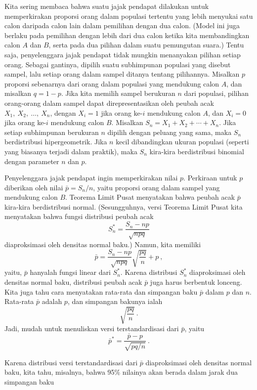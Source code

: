 \begin{example}\label{exam 9.4.1}
Kita sering membaca bahwa suatu jajak pendapat dilakukan untuk memperkirakan proporsi orang
dalam populasi tertentu yang lebih menyukai satu calon daripada calon lain dalam pemilihan dengan dua calon. 
(Model ini juga berlaku pada pemilihan dengan lebih dari dua calon ketika kita membandingkan calon $A$ dan $B$, serta pada dua pilihan
dalam suatu pemungutan suara.)  Tentu saja, penyelenggara jajak pendapat tidak mungkin menanyakan pilihan setiap orang. 
Sebagai gantinya, dipilih suatu subhimpunan populasi yang disebut sampel, lalu
setiap orang dalam sampel ditanya tentang pilihannya.  Misalkan $p$ proporsi sebenarnya dari orang dalam
populasi yang mendukung calon $A$, dan misalkan $q = 1-p$.  Jika kita memilih sampel berukuran $n$
dari populasi, pilihan orang-orang dalam sampel dapat direpresentasikan oleh peubah acak
$X_1,\ X_2,\ \ldots,\ X_n$, dengan $X_i = 1$ jika orang ke-$i$ mendukung calon $A$,
dan $X_i = 0$ jika orang ke-$i$ mendukung calon $B$.  Misalkan $S_n = X_1 + X_2 + \cdots + X_n$. 
Jika setiap subhimpunan berukuran $n$ dipilih dengan peluang yang sama, maka $S_n$ berdistribusi
hipergeometrik.  Jika $n$ kecil dibandingkan ukuran populasi (seperti yang biasanya terjadi dalam
praktik), maka $S_n$ kira-kira berdistribusi binomial dengan parameter $n$ dan $p$.
\par
Penyelenggara jajak pendapat ingin memperkirakan nilai $p$.  Perkiraan untuk $p$ diberikan oleh nilai
$\bar p = S_n/n$, yaitu proporsi orang dalam sampel yang mendukung calon $B$.
Teorema Limit Pusat menyatakan bahwa peubah acak $\bar p$ kira-kira berdistribusi
normal.  (Sesungguhnya, versi Teorema Limit Pusat kita menyatakan bahwa fungsi
distribusi peubah acak
$$S_n^* = \frac{S_n - np}{\sqrt{npq}}$$
diaproksimasi oleh densitas normal baku.)  Namun, kita memiliki
$$\bar p = \frac{S_n - np}{\sqrt {npq}}\sqrt{\frac{pq}{n}}+p\ ,$$
yaitu, $\bar p$ hanyalah fungsi linear dari $S_n^*$.  Karena distribusi $S_n^*$
diaproksimasi oleh densitas normal baku, distribusi peubah acak $\bar p$
juga harus berbentuk lonceng.  Kita juga tahu cara menyatakan rata-rata dan simpangan baku $\bar p$
dalam
$p$ dan
$n$.  Rata-rata $\bar p$ adalah $p$, dan simpangan bakunya ialah
$$\sqrt{\frac{pq}{n}}\ .$$
Jadi, mudah untuk menuliskan versi terstandardisasi dari $\bar p$, yaitu
$$\bar p^* = \frac{\bar p - p}{\sqrt{pq/n}}\ .$$
\par
Karena distribusi versi terstandardisasi dari $\bar p$ diaproksimasi oleh densitas
normal baku, kita tahu, misalnya, bahwa 95\% nilainya akan berada dalam jarak dua simpangan baku

\end{example}

